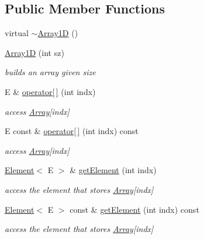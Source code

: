 \subsection*{Public Member Functions}
\begin{DoxyCompactItemize}
\item 
virtual \hyperlink{classbridges_1_1datastructure_1_1_array1_d_a690a7802e32842acfda2688459bb2caa}{$\sim$\+Array1D} ()
\item 
\hyperlink{classbridges_1_1datastructure_1_1_array1_d_a04e070ed24a1c6e9d200add01ec91c95}{Array1D} (int sz)
\begin{DoxyCompactList}\small\item\em builds an array given size \end{DoxyCompactList}\item 
E \& \hyperlink{classbridges_1_1datastructure_1_1_array1_d_ac0e28b33231ba865d00dbaf1ad4d1b5b}{operator\mbox{[}$\,$\mbox{]}} (int indx)
\begin{DoxyCompactList}\small\item\em access \hyperlink{classbridges_1_1datastructure_1_1_array}{Array}\mbox{[}indx\mbox{]} \end{DoxyCompactList}\item 
E const  \& \hyperlink{classbridges_1_1datastructure_1_1_array1_d_a3eee632c4ba3bce5694da00f07e1ac65}{operator\mbox{[}$\,$\mbox{]}} (int indx) const
\begin{DoxyCompactList}\small\item\em access \hyperlink{classbridges_1_1datastructure_1_1_array}{Array}\mbox{[}indx\mbox{]} \end{DoxyCompactList}\item 
\hyperlink{classbridges_1_1datastructure_1_1_element}{Element}$<$ E $>$ \& \hyperlink{classbridges_1_1datastructure_1_1_array1_d_a48fbe4ee71c52303033effcd4e1369c0}{get\+Element} (int indx)
\begin{DoxyCompactList}\small\item\em access the element that stores \hyperlink{classbridges_1_1datastructure_1_1_array}{Array}\mbox{[}indx\mbox{]} \end{DoxyCompactList}\item 
\hyperlink{classbridges_1_1datastructure_1_1_element}{Element}$<$ E $>$ const  \& \hyperlink{classbridges_1_1datastructure_1_1_array1_d_a92398a260b9d2a09d6f1f536a36a0988}{get\+Element} (int indx) const
\begin{DoxyCompactList}\small\item\em access the element that stores \hyperlink{classbridges_1_1datastructure_1_1_array}{Array}\mbox{[}indx\mbox{]} \end{DoxyCompactList}\item 

\end{DoxyCompactItemize}
